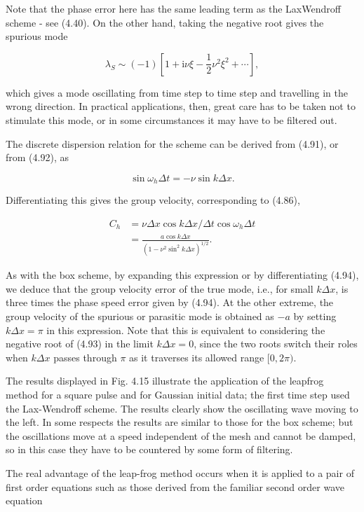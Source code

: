 \documentclass[10pt]{article}
\begin{document}
Note that the phase error here has the same leading term as the LaxWendroff scheme - see (4.40). On the other hand, taking the negative root gives the spurious mode

\[
\lambda_{S} \sim(-1)\left[1+\mathrm{i} \nu \xi-\frac{1}{2} \nu^{2} \xi^{2}+\cdots\right],
\]

which gives a mode oscillating from time step to time step and travelling in the wrong direction. In practical applications, then, great care has to be taken not to stimulate this mode, or in some circumstances it may have to be filtered out.

The discrete dispersion relation for the scheme can be derived from (4.91), or from (4.92), as

\[
\sin \omega_{h} \Delta t=-\nu \sin k \Delta x .
\]

Differentiating this gives the group velocity, corresponding to (4.86),

\[
\begin{aligned}
C_{h} & =\nu \Delta x \cos k \Delta x / \Delta t \cos \omega_{h} \Delta t \\
& =\frac{a \cos k \Delta x}{\left(1-\nu^{2} \sin ^{2} k \Delta x\right)^{1 / 2}} .
\end{aligned}
\]

As with the box scheme, by expanding this expression or by differentiating (4.94), we deduce that the group velocity error of the true mode, i.e., for small \(k \Delta x\), is three times the phase speed error given by (4.94). At the other extreme, the group velocity of the spurious or parasitic mode is obtained as \(-a\) by setting \(k \Delta x=\pi\) in this expression. Note that this is equivalent to considering the negative root of (4.93) in the limit \(k \Delta x=0\), since the two roots switch their roles when \(k \Delta x\) passes through \(\pi\) as it traverses its allowed range \([0,2 \pi)\).

The results displayed in Fig. 4.15 illustrate the application of the leapfrog method for a square pulse and for Gaussian initial data; the first time step used the Lax-Wendroff scheme. The results clearly show the oscillating wave moving to the left. In some respects the results are similar to those for the box scheme; but the oscillations move at a speed independent of the mesh and cannot be damped, so in this case they have to be countered by some form of filtering.

The real advantage of the leap-frog method occurs when it is applied to a pair of first order equations such as those derived from the familiar second order wave equation
\end{document}
